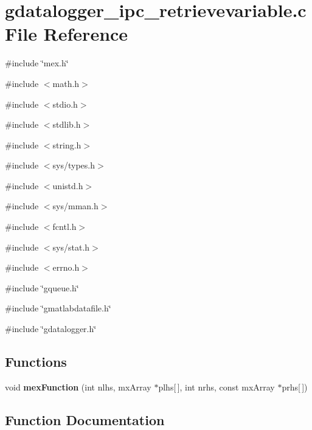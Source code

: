 \section{gdatalogger\_\-ipc\_\-retrievevariable.c File Reference}
\label{libs_2gdatalogger_2demo-xenomai_2matlab_2gdatalogger__ipc__retrievevariable_8c}
{\ttfamily \#include \char`\"{}mex.h\char`\"{}}\par
{\ttfamily \#include $<$math.h$>$}\par
{\ttfamily \#include $<$stdio.h$>$}\par
{\ttfamily \#include $<$stdlib.h$>$}\par
{\ttfamily \#include $<$string.h$>$}\par
{\ttfamily \#include $<$sys/types.h$>$}\par
{\ttfamily \#include $<$unistd.h$>$}\par
{\ttfamily \#include $<$sys/mman.h$>$}\par
{\ttfamily \#include $<$fcntl.h$>$}\par
{\ttfamily \#include $<$sys/stat.h$>$}\par
{\ttfamily \#include $<$errno.h$>$}\par
{\ttfamily \#include \char`\"{}gqueue.h\char`\"{}}\par
{\ttfamily \#include \char`\"{}gmatlabdatafile.h\char`\"{}}\par
{\ttfamily \#include \char`\"{}gdatalogger.h\char`\"{}}\par
\subsection*{Functions}
\begin{DoxyCompactItemize}
\item 
void {\bf mexFunction} (int nlhs, mxArray $\ast$plhs[$\,$], int nrhs, const mxArray $\ast$prhs[$\,$])
\end{DoxyCompactItemize}


\subsection{Function Documentation}
